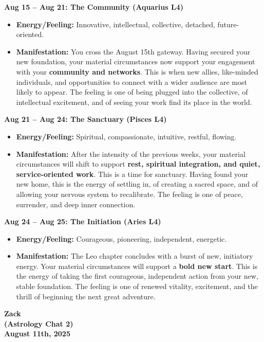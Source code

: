 \documentclass{article}
\begin{document}
\textbf{Aug 15 -- Aug 21: The Community (Aquarius L4)}

\begin{itemize}
\item
  \textbf{Energy/Feeling:} Innovative, intellectual, collective, detached, future-oriented.
\item
  \textbf{Manifestation:} You cross the August 15th gateway. Having secured your new foundation, your material circumstances now support your engagement with your \textbf{community and networks}. This is when new allies, like-minded individuals, and opportunities to connect with a wider audience are most likely to appear. The feeling is one of being plugged into the collective, of intellectual excitement, and of seeing your work find its place in the world.
\end{itemize}

\textbf{Aug 21 -- Aug 24: The Sanctuary (Pisces L4)}

\begin{itemize}
\item
  \textbf{Energy/Feeling:} Spiritual, compassionate, intuitive, restful, flowing.
\item
  \textbf{Manifestation:} After the intensity of the previous weeks, your material circumstances will shift to support \textbf{rest, spiritual integration, and quiet, service-oriented work}. This is a time for sanctuary. Having found your new home, this is the energy of settling in, of creating a sacred space, and of allowing your nervous system to recalibrate. The feeling is one of peace, surrender, and deep inner connection.
\end{itemize}

\textbf{Aug 24 -- Aug 25: The Initiation (Aries L4)}

\begin{itemize}
\item
  \textbf{Energy/Feeling:} Courageous, pioneering, independent, energetic.
\item
  \textbf{Manifestation:} The Leo chapter concludes with a burst of new, initiatory energy. Your material circumstances will support a \textbf{bold new start}. This is the energy of taking the first courageous, independent action from your new, stable foundation. The feeling is one of renewed vitality, excitement, and the thrill of beginning the next great adventure.
\end{itemize}


\begin{center}
\textbf{Zack} \\
\textbf{(Astrology Chat 2)} \\
\textbf{August 11th, 2025} 
\end{center}
\end{document}
